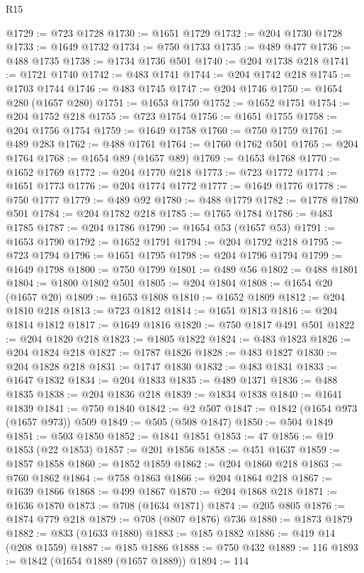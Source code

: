\begin{lexlean}{R15}
\begin{coremodule}
{{{{{{@1729 := @723 @1728
@1730 := @1651 @1729
@1732 := @204 @1730 @1728
@1733 := @1649 @1732
@1734 := @750 @1733
@1735 := @489 @477
@1736 := @488 @1735
@1738 := @1734 @1736 @501
@1740 := @204 @1738 @218
@1741 := @1721 @1740
@1742 := @483 @1741
@1744 := @204 @1742 @218
@1745 := @1703 @1744
@1746 := @483 @1745
@1747 := @204 @1746
@1750 := @1654 @280 (@1657 @280)
@1751 := @1653 @1750
@1752 := @1652 @1751
@1754 := @204 @1752 @218
@1755 := @723 @1754
@1756 := @1651 @1755
@1758 := @204 @1756 @1754
@1759 := @1649 @1758
@1760 := @750 @1759
@1761 := @489 @283
@1762 := @488 @1761
@1764 := @1760 @1762 @501
@1765 := @204 @1764
@1768 := @1654 @89 (@1657 @89)
@1769 := @1653 @1768
@1770 := @1652 @1769
@1772 := @204 @1770 @218
@1773 := @723 @1772
@1774 := @1651 @1773
@1776 := @204 @1774 @1772
@1777 := @1649 @1776
@1778 := @750 @1777
@1779 := @489 @92
@1780 := @488 @1779
@1782 := @1778 @1780 @501
@1784 := @204 @1782 @218
@1785 := @1765 @1784
@1786 := @483 @1785
@1787 := @204 @1786
@1790 := @1654 @53 (@1657 @53)
@1791 := @1653 @1790
@1792 := @1652 @1791
@1794 := @204 @1792 @218
@1795 := @723 @1794
@1796 := @1651 @1795
@1798 := @204 @1796 @1794
@1799 := @1649 @1798
@1800 := @750 @1799
@1801 := @489 @56
@1802 := @488 @1801
@1804 := @1800 @1802 @501
@1805 := @204 @1804
@1808 := @1654 @20 (@1657 @20)
@1809 := @1653 @1808
@1810 := @1652 @1809
@1812 := @204 @1810 @218
@1813 := @723 @1812
@1814 := @1651 @1813
@1816 := @204 @1814 @1812
@1817 := @1649 @1816
@1820 := @750 @1817 @491 @501
@1822 := @204 @1820 @218
@1823 := @1805 @1822
@1824 := @483 @1823
@1826 := @204 @1824 @218
@1827 := @1787 @1826
@1828 := @483 @1827
@1830 := @204 @1828 @218
@1831 := @1747 @1830
@1832 := @483 @1831
@1833 := @1647 @1832
@1834 := @204 @1833
@1835 := @489 @1371
@1836 := @488 @1835
@1838 := @204 @1836 @218
@1839 := @1834 @1838
@1840 := @1641 @1839
@1841 := @750 @1840
@1842 := @2 @507
@1847 := @1842 (@1654 @973 (@1657 @973)) @509
@1849 := @505 (@508 @1847)
@1850 := @504 @1849
@1851 := @503 @1850
@1852 := @1841 @1851
@1853 := 47
@1856 := @19 @1853 (@22 @1853)
@1857 := @201 @1856
@1858 := @451 @1637
@1859 := @1857 @1858
@1860 := @1852 @1859
@1862 := @204 @1860 @218
@1863 := @760 @1862
@1864 := @758 @1863
@1866 := @204 @1864 @218
@1867 := @1639 @1866
@1868 := @499 @1867
@1870 := @204 @1868 @218
@1871 := @1636 @1870
@1873 := @708 (@1634 @1871)
@1874 := @205 @805
@1876 := @1874 @779 @218
@1879 := @708 (@807 @1876) @736
@1880 := @1873 @1879
@1882 := @833 (@1633 @1880)
@1883 := @185 @1882
@1886 := @419 @14 (@208 @1559)
@1887 := @185 @1886
@1888 := @750 @432
@1889 := 116
@1893 := @1842 (@1654 @1889 (@1657 @1889))
@1894 := 114
}}}}}}
\end{coremodule}
\end{lexlean}
